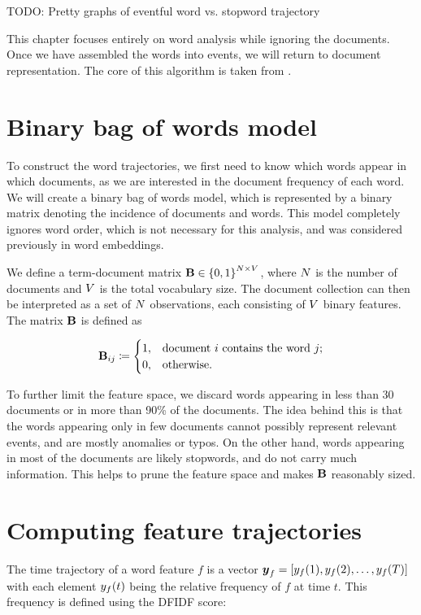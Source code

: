{\color{red} TODO: Pretty graphs of eventful word vs. stopword trajectory}

This chapter focuses entirely on word analysis while ignoring the documents. Once we have assembled the words into events, we will return to document representation. The core of this algorithm is taken from \cite{event-detection}.


\section{Binary bag of words model}
To construct the word trajectories, we first need to know which words appear in which documents, as we are interested in the document frequency of each word. We will create a binary bag of words model, which is represented by a binary matrix denoting the incidence of documents and words. This model completely ignores word order, which is not necessary for this analysis, and was considered previously in word embeddings.

We define a term-document matrix $\mathbf{B} \in \left\{ 0, 1 \right\}^{N \times V}$, where $N$ is the number of documents and $V$ is the total vocabulary size. The document collection can then be interpreted as a set of $N$ observations, each consisting of $V$ binary features. The matrix $\mathbf{B}$ is defined as

\begin{equation} \label{eq:bow-matrix}
	\mathbf{B}_{ij} \coloneqq
	\begin{cases}
		1, & \text{document}~i~\text{contains the word}~j \text{;} \\
		0, & \text{otherwise.}
	\end{cases}
\end{equation}

To further limit the feature space, we discard words appearing in less than 30 documents or in more than 90\% of the documents. The idea behind this is that the words appearing only in few documents cannot possibly represent relevant events, and are mostly anomalies or typos. On the other hand, words appearing in most of the documents are likely stopwords, and do not carry much information. This helps to prune the feature space and makes $\mathbf{B}$ reasonably sized.


\section{Computing feature trajectories}
The time trajectory of a word feature $f$ is a vector $\vect{\traj}_{f} = \left[ \traj_{f}(1), \traj_{f}(2), \dots, \traj_{f}(\streamlen) \right]$ with each element $y_{f}(t)$ being the relative frequency of $f$ at time $t$. This frequency is defined using the DFIDF score:

